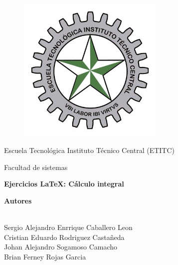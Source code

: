 \documentclass[a4paper,11pt]{book}
\begin{document}
 

\begin{titlepage} 

\begin{center} 

\vspace*{-1in} 

\begin{figure}[htb] 

\begin{center} 

\includegraphics[width=7cm]{ETITC.png} 

\end{center} 

\end{figure} 

{\sc \huge Escuela Tecnológica Instituto Técnico Central (ETITC)}\\ 

\vspace*{0.15in} 

Facultad de sistemas\\ 

\vspace*{0.6in} 

\begin{Large} 

\textbf{Ejercicios {\LaTeX}: Cálculo integral} \\ 

\end{Large} 

\vspace*{0.3in} 

\begin{large} 

{\bf Autores} \\ 

\  

Sergio Alejandro Enrrique Caballero Leon\\ 
Cristian Eduardo Rodriguez Castañeda \\ 
Johan Alejandro Sogamoso Camacho \\ 
Brian Ferney Rojas Garcia


\end{large}
\end{center}
\end{titlepage}
\end{document}
